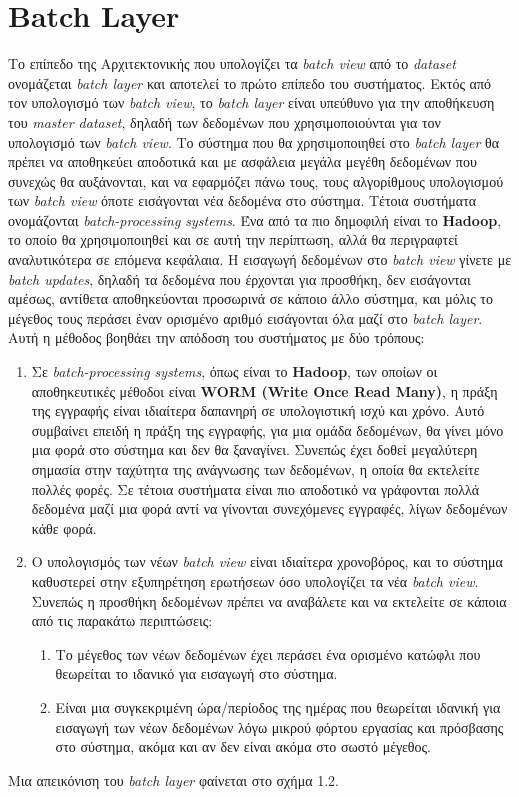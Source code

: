 \section{Batch Layer}
Το επίπεδο της Αρχιτεκτονικής που υπολογίζει τα \textit{batch view} από το \textit{dataset} ονομάζεται \textit{batch layer} και αποτελεί το πρώτο επίπεδο του συστήματος. Εκτός από τον υπολογισμό των \textit{batch view}, το \textit{batch layer} είναι υπεύθυνο για την αποθήκευση του \textit{master dataset}, δηλαδή των δεδομένων που χρησιμοποιούνται για τον υπολογισμό των \textit{batch view}. Το σύστημα που θα χρησιμοποιηθεί στο \textit{batch layer} θα πρέπει να αποθηκεύει αποδοτικά και με ασφάλεια μεγάλα μεγέθη δεδομένων που συνεχώς θα αυξάνονται, και να εφαρμόζει πάνω τους, τους αλγορίθμους υπολογισμού των \textit{batch view} όποτε εισάγονται νέα δεδομένα στο σύστημα. Τέτοια συστήματα ονομάζονται \textit{batch-processing systems}. Ένα από τα πιο δημοφιλή είναι το \textbf{Hadoop}, το οποίο θα χρησιμοποιηθεί και σε αυτή την περίπτωση, αλλά θα περιγραφτεί αναλυτικότερα σε επόμενα κεφάλαια.
\newline
Η εισαγωγή δεδομένων στο \textit{batch view} γίνετε με \textit{batch updates}, δηλαδή τα δεδομένα που έρχονται για προσθήκη, δεν εισάγονται αμέσως, αντίθετα αποθηκεύονται προσωρινά σε κάποιο άλλο σύστημα, και μόλις το μέγεθος τους περάσει έναν ορισμένο αριθμό εισάγονται όλα μαζί στο \textit{batch layer}. Αυτή η μέθοδος βοηθάει την απόδοση του συστήματος με δύο τρόπους:
\begin{enumerate}
\item Σε \textit{batch-processing systems}, όπως είναι το \textbf{Hadoop}, των οποίων οι αποθηκευτικές μέθοδοι είναι \textbf{WORM (Write Once Read Many)}, η πράξη της εγγραφής είναι ιδιαίτερα δαπανηρή σε υπολογιστική ισχύ και χρόνο. Αυτό συμβαίνει επειδή η πράξη της εγγραφής, για μια ομάδα δεδομένων, θα γίνει μόνο μια φορά στο σύστημα και δεν θα ξαναγίνει. Συνεπώς έχει δοθεί μεγαλύτερη σημασία στην ταχύτητα της ανάγνωσης των δεδομένων, η οποία θα εκτελείτε πολλές φορές. Σε τέτοια συστήματα είναι πιο αποδοτικό να γράφονται πολλά δεδομένα μαζί μια φορά αντί να γίνονται συνεχόμενες εγγραφές, λίγων δεδομένων κάθε φορά.
\item Ο υπολογισμός των νέων \textit{batch view} είναι ιδιαίτερα χρονοβόρος, και το σύστημα καθυστερεί στην εξυπηρέτηση ερωτήσεων όσο υπολογίζει τα νέα \textit{batch view}. Συνεπώς η προσθήκη δεδομένων πρέπει να αναβάλετε και να εκτελείτε σε κάποια από τις παρακάτω περιπτώσεις:
\begin{enumerate}
\item Το μέγεθος των νέων δεδομένων έχει περάσει ένα ορισμένο κατώφλι που θεωρείται το ιδανικό για εισαγωγή στο σύστημα.
\item Είναι μια συγκεκριμένη ώρα/περίοδος της ημέρας που θεωρείται ιδανική για εισαγωγή των νέων δεδομένων λόγω μικρού φόρτου εργασίας και πρόσβασης στο σύστημα, ακόμα και αν δεν είναι ακόμα στο σωστό μέγεθος.
\end{enumerate}
\end{enumerate}
Μια απεικόνιση του \textit{batch layer} φαίνεται στο σχήμα 1.2.

